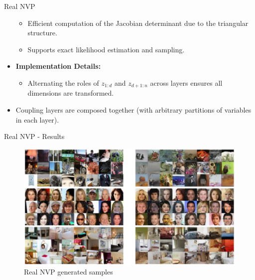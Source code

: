 \begin{frame}[allowframebreaks]{Real NVP}
\begin{itemize}
    \begin{itemize}
        \item Efficient computation of the Jacobian determinant due to the triangular structure.
        \item Supports exact likelihood estimation and sampling.
    \end{itemize}
    \item \textbf{Implementation Details:}
    \begin{itemize}
        \item Alternating the roles of $z_{1:d}$ and $z_{d+1:n}$ across layers ensures all dimensions are transformed.
    \end{itemize}
    \item Coupling layers are composed together (with arbitrary partitions of variables in each layer).
    
\end{itemize}
\end{frame}

\begin{frame}{Real NVP - Results}
\begin{figure}
    \centering
    \includegraphics[height=0.8\textheight, width=\textwidth, keepaspectratio]{images/norm-flow/nfm_realnvp_results.png}
    \caption*{Real NVP generated samples}
\end{figure}
\end{frame}